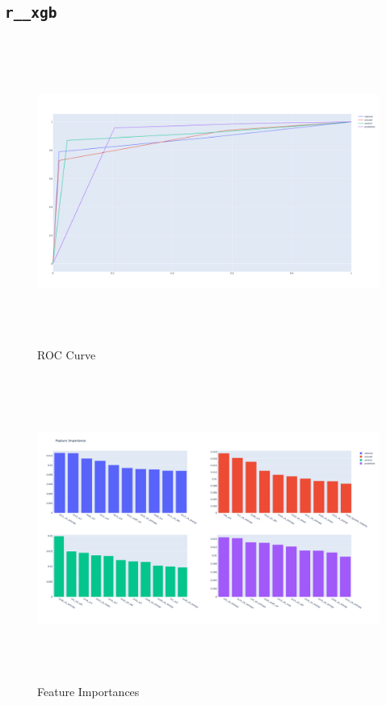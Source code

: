 \subsection{\texttt{r\_\_xgb}}
\begin{figure}[H]
\centering
\hspace*{-1.5cm}
\includegraphics[height=10cm]{Figures/res_roc__r_xgb.png}
\caption{ROC Curve}
\label{fig23}
\end{figure}

\begin{figure}[H]
\centering
\hspace*{-1.5cm}
\includegraphics[height=10cm]{Figures/res_feature_importance__r_xgb.png}
\caption{Feature Importances}
\label{fig23}
\end{figure}
